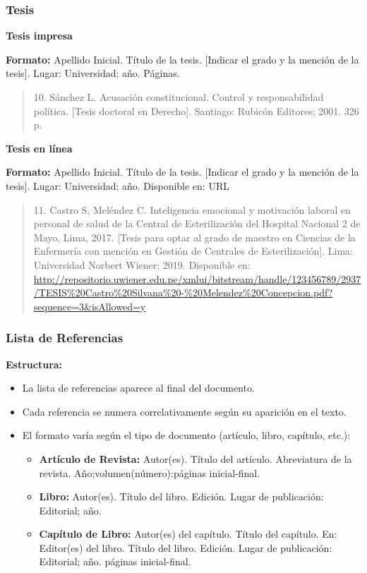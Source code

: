 \documentclass[
11pt, %
]{beamer}
\begin{document}
\begin{frame}
	\frametitle{Tesis}

	\textbf{Tesis impresa}

	\textbf{Formato:} Apellido Inicial. Título de la tesis. [Indicar el grado y la mención de la tesis]. Lugar: Universidad; año. Páginas.

	\begin{quote}
		10.  Sánchez L. Acusación constitucional. Control y responsabilidad política. [Tesis doctoral en Derecho]. Santiago: Rubicón Editores; 2001. 326 p.
	\end{quote}


	\textbf{Tesis en línea}

	\textbf{Formato:} Apellido Inicial. Título de la tesis. [Indicar el grado y la mención de la tesis]. Lugar: Universidad; año. Disponible en: URL

	\begin{quote}
		11.  Castro S, Meléndez C. Inteligencia emocional y motivación laboral en personal de salud de la Central de Esterilización del Hospital Nacional 2 de Mayo, Lima, 2017. [Tesis para optar al grado de maestro en Ciencias de la Enfermería con mención en Gestión de Centrales de Esterilización]. Lima: Universidad Norbert Wiener; 2019. Disponible en: \url{http://repositorio.uwiener.edu.pe/xmlui/bitstream/handle/123456789/2937/TESIS\%20Castro\%20Silvana\%20-\%20Melendez\%20Concepcion.pdf?sequence=3\&isAllowed=y}
	\end{quote}

\end{frame}



\begin{frame}
	\frametitle{Lista de Referencias}

	\textbf{Estructura:}
	\begin{itemize}
		\item La lista de referencias aparece al final del documento.
		\item Cada referencia se numera correlativamente según su aparición en el texto.
		\item El formato varía según el tipo de documento (artículo, libro, capítulo, etc.):
		      \begin{itemize}
			      \item \textbf{Artículo de Revista:} Autor(es). Título del artículo. Abreviatura de la revista. Año;volumen(número):páginas inicial-final.
			      \item \textbf{Libro:} Autor(es). Título del libro. Edición. Lugar de publicación: Editorial; año.
			      \item \textbf{Capítulo de Libro:} Autor(es) del capítulo. Título del capítulo. En: Editor(es) del libro. Título del libro. Edición. Lugar de publicación: Editorial; año. páginas inicial-final.
		      \end{itemize}
	\end{itemize}

\end{frame}
\end{document}
